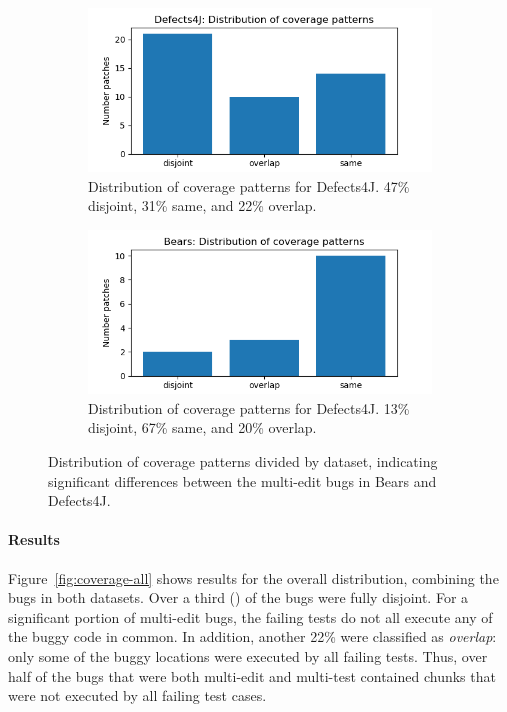 \begin{figure}
	\begin{subfigure}{\linewidth}
		\includegraphics[width=\linewidth]{img/coverage-d4j.png}
		\caption{Distribution of coverage patterns for Defects4J. 47\% disjoint, 31\% same, and 22\% 
		overlap.}
	\end{subfigure}
	\begin{subfigure}{\linewidth}
		\includegraphics[width=\linewidth]{img/coverage-bears.png}
		\caption{Distribution of coverage patterns for Defects4J. 13\% disjoint, 67\% same, and 20\% 
		overlap.}
	\end{subfigure}
	\caption{Distribution of coverage patterns divided by dataset,
          indicating significant differences between the multi-edit bugs in
          Bears and Defects4J.}
	\label{fig:coverage-datasets}
\end{figure}

\paragraph{Results}
Figure~\ref{fig:coverage-all} shows results for the overall distribution,
combining the bugs in both datasets. Over a third ()
of the bugs were fully disjoint.  For a significant portion of multi-edit bugs,
the failing tests do not all execute any of the buggy code in common.  
In addition, another 22\% were classified as \emph{overlap}: only some of the
buggy locations were executed by all failing tests. Thus, over half of 
the bugs that were both multi-edit and multi-test contained chunks that were 
not executed by all failing test cases.

